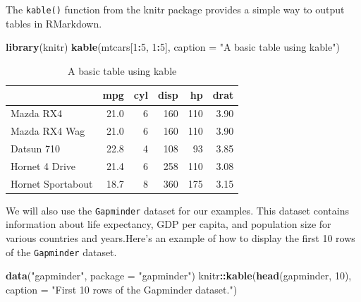 \documentclass[
]{book}
\newenvironment{Shaded}{\begin{snugshade}}{\end{snugshade}}
\newcommand{\AttributeTok}[1]{\textcolor[rgb]{0.13,0.29,0.53}{#1}}
\newcommand{\DecValTok}[1]{\textcolor[rgb]{0.00,0.00,0.81}{#1}}
\newcommand{\FunctionTok}[1]{\textcolor[rgb]{0.13,0.29,0.53}{\textbf{#1}}}
\newcommand{\NormalTok}[1]{#1}
\newcommand{\SpecialCharTok}[1]{\textcolor[rgb]{0.81,0.36,0.00}{\textbf{#1}}}
\newcommand{\StringTok}[1]{\textcolor[rgb]{0.31,0.60,0.02}{#1}}
\begin{document}
The \texttt{kable()} function from the knitr package provides a simple way to output tables in RMarkdown.

\begin{Shaded}
\begin{Highlighting}[]
\FunctionTok{library}\NormalTok{(knitr)}
\FunctionTok{kable}\NormalTok{(mtcars[}\DecValTok{1}\SpecialCharTok{:}\DecValTok{5}\NormalTok{, }\DecValTok{1}\SpecialCharTok{:}\DecValTok{5}\NormalTok{], }\AttributeTok{caption =} \StringTok{"A basic table using kable"}\NormalTok{)}
\end{Highlighting}
\end{Shaded}

\begin{table}

\caption{\label{tab:unnamed-chunk-1}A basic table using kable}
\centering
\begin{tabular}[t]{l|r|r|r|r|r}
\hline
  & mpg & cyl & disp & hp & drat\\
\hline
Mazda RX4 & 21.0 & 6 & 160 & 110 & 3.90\\
\hline
Mazda RX4 Wag & 21.0 & 6 & 160 & 110 & 3.90\\
\hline
Datsun 710 & 22.8 & 4 & 108 & 93 & 3.85\\
\hline
Hornet 4 Drive & 21.4 & 6 & 258 & 110 & 3.08\\
\hline
Hornet Sportabout & 18.7 & 8 & 360 & 175 & 3.15\\
\hline
\end{tabular}
\end{table}

We will also use the \texttt{Gapminder} dataset for our examples. This dataset contains information about life expectancy, GDP per capita, and population size for various countries and years.Here's an example of how to display the first 10 rows of the \texttt{Gapminder} dataset.

\begin{Shaded}
\begin{Highlighting}[]
\FunctionTok{data}\NormalTok{(}\StringTok{"gapminder"}\NormalTok{, }\AttributeTok{package =} \StringTok{"gapminder"}\NormalTok{)}
\NormalTok{knitr}\SpecialCharTok{::}\FunctionTok{kable}\NormalTok{(}\FunctionTok{head}\NormalTok{(gapminder, }\DecValTok{10}\NormalTok{), }\AttributeTok{caption =} \StringTok{"First 10 rows of the Gapminder dataset."}\NormalTok{)}
\end{Highlighting}
\end{Shaded}
\end{document}
